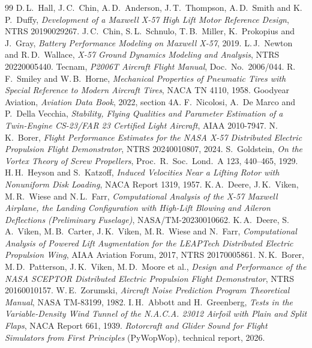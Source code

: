 \documentclass[10pt,a4paper,twocolumn]{article}
\begin{document}
\begin{thebibliography}{99}
 D.\,L.\ Hall, J.\,C.\ Chin, A.\,D.\ Anderson, J.\,T.\ Thompson, A.\,D.\ Smith and K.\,P.\ Duffy, \emph{Development of a Maxwell X-57 High Lift Motor Reference Design}, NTRS 20190029267.
 J.\,C.\ Chin, S.\,L.\ Schnulo, T.\,B.\ Miller, K.\ Prokopius and J.\ Gray, \emph{Battery Performance Modeling on Maxwell X-57}, 2019.
 L.\,J.\ Newton and R.\,D.\ Wallace, \emph{X-57 Ground Dynamics Modeling and Analysis}, NTRS 20220005440.
 Tecnam, \emph{P2006T Aircraft Flight Manual}, Doc.\ No.\ 2006/044.
 R.\,F.\ Smiley and W.\,B.\ Horne, \emph{Mechanical Properties of Pneumatic Tires with Special Reference to Modern Aircraft Tires}, NACA TN 4110, 1958.
 Goodyear Aviation, \emph{Aviation Data Book}, 2022, section 4A.
 F.\ Nicolosi, A.\ De Marco and P.\ Della Vecchia, \emph{Stability, Flying Qualities and Parameter Estimation of a Twin-Engine CS-23/FAR 23 Certified Light Aircraft}, AIAA 2010-7947.
 N.\,K.\ Borer, \emph{Flight Performance Estimates for the NASA X-57 Distributed Electric Propulsion Flight Demonstrator}, NTRS 20240010807, 2024.
 S.\ Goldstein, \emph{On the Vortex Theory of Screw Propellers}, Proc.\ R.\ Soc.\ Lond.\ A 123, 440--465, 1929.
 H.\,H.\ Heyson and S.\ Katzoff, \emph{Induced Velocities Near a Lifting Rotor with Nonuniform Disk Loading}, NACA Report 1319, 1957.
 K.\,A.\ Deere, J.\,K.\ Viken, M.\,R.\ Wiese and N.\,L.\ Farr, \emph{Computational Analysis of the X-57 Maxwell Airplane, the Landing Configuration with High-Lift Blowing and Aileron Deflections (Preliminary Fuselage)}, NASA/TM-20230010662.
 K.\,A.\ Deere, S.\,A.\ Viken, M.\,B.\ Carter, J.\,K.\ Viken, M.\,R.\ Wiese and N.\ Farr, \emph{Computational Analysis of Powered Lift Augmentation for the LEAPTech Distributed Electric Propulsion Wing}, AIAA Aviation Forum, 2017, NTRS 20170005861.
 N.\,K.\ Borer, M.\,D.\ Patterson, J.\,K.\ Viken, M.\,D.\ Moore et al., \emph{Design and Performance of the NASA SCEPTOR Distributed Electric Propulsion Flight Demonstrator}, NTRS 20160010157.
 W.\,E.\ Zorumski, \emph{Aircraft Noise Prediction Program Theoretical Manual}, NASA TM-83199, 1982.
 I.\,H.\ Abbott and H.\ Greenberg, \emph{Tests in the Variable-Density Wind Tunnel of the N.A.C.A. 23012 Airfoil with Plain and Split Flaps}, NACA Report 661, 1939.
 \emph{Rotorcraft and Glider Sound for Flight Simulators from First Principles} (PyWopWop), technical report, 2026.
\end{thebibliography}
\end{document}
